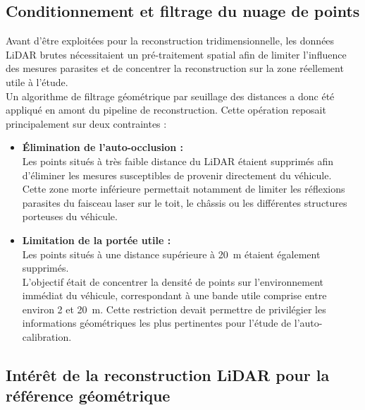 \documentclass[12pt,a4paper,oneside]{report}
\begin{document}
\subsection{Conditionnement et filtrage du nuage de points}

\hspace*{.3cm}Avant d'être exploitées pour la reconstruction tridimensionnelle, les données LiDAR brutes nécessitaient un pré-traitement spatial afin de limiter l'influence des mesures parasites et de concentrer la reconstruction sur la zone réellement utile à l'étude.\\

\hspace*{.3cm}Un algorithme de filtrage géométrique par seuillage des distances a donc été appliqué en amont du pipeline de reconstruction. Cette opération reposait principalement sur deux contraintes :

\begin{itemize}[itemsep=0.5em]

\item \textbf{Élimination de l'auto-occlusion :}\\
Les points situés à très faible distance du LiDAR étaient supprimés afin d'éliminer les mesures susceptibles de provenir directement du véhicule.\\
Cette zone morte inférieure permettait notamment de limiter les réflexions parasites du faisceau laser sur le toit, le châssis ou les différentes structures porteuses du véhicule.

\item \textbf{Limitation de la portée utile :}\\
Les points situés à une distance supérieure à 20~m étaient également supprimés.\\
L'objectif était de concentrer la densité de points sur l'environnement immédiat du véhicule, correspondant à une bande utile comprise entre environ 2 et 20~m. Cette restriction devait permettre de privilégier les informations géométriques les plus pertinentes pour l'étude de l'auto-calibration.

\end{itemize}

\newpage

\subsection{Intérêt de la reconstruction LiDAR pour la référence géométrique}
\end{document}
